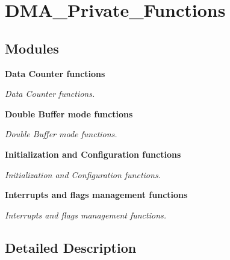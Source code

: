 \section{D\+M\+A\+\_\+\+Private\+\_\+\+Functions}
\label{group__DMA__Private__Functions}
\subsection*{Modules}
\begin{DoxyCompactItemize}
\item 
\textbf{ Data Counter functions}
\begin{DoxyCompactList}\small\item\em Data Counter functions. \end{DoxyCompactList}\item 
\textbf{ Double Buffer mode functions}
\begin{DoxyCompactList}\small\item\em Double Buffer mode functions. \end{DoxyCompactList}\item 
\textbf{ Initialization and Configuration functions}
\begin{DoxyCompactList}\small\item\em Initialization and Configuration functions. \end{DoxyCompactList}\item 
\textbf{ Interrupts and flags management functions}
\begin{DoxyCompactList}\small\item\em Interrupts and flags management functions. \end{DoxyCompactList}\end{DoxyCompactItemize}


\subsection{Detailed Description}
